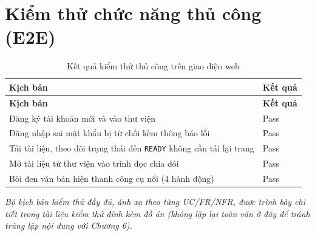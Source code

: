 \section{Kiểm thử chức năng thủ công (E2E)}
\begin{longtable}{|L{0.45\textwidth}|L{0.45\textwidth}|}
\caption{Kết quả kiểm thử thủ công trên giao diện web}\label{tab:appendix-e2e}\\
\hline
\textbf{Kịch bản} & \textbf{Kết quả} \\\hline
\endfirsthead
\hline
\textbf{Kịch bản} & \textbf{Kết quả} \\\hline
\endhead
Đăng ký tài khoản mới và vào thư viện & Pass \\\hline
Đăng nhập sai mật khẩu bị từ chối kèm thông báo lỗi & Pass \\\hline
Tải tài liệu, theo dõi trạng thái đến \texttt{READY} không cần tải lại trang & Pass \\\hline
Mở tài liệu từ thư viện vào trình đọc chia đôi & Pass \\\hline
Bôi đen văn bản hiện thanh công cụ nổi (4 hành động) & Pass \\\hline
\end{longtable}

\textit{Bộ kịch bản kiểm thử đầy đủ, ánh xạ theo từng UC/FR/NFR, được trình bày chi tiết trong tài liệu kiểm thử đính kèm đồ án (không lặp lại toàn văn ở đây để tránh trùng lặp nội dung với Chương 6).}
